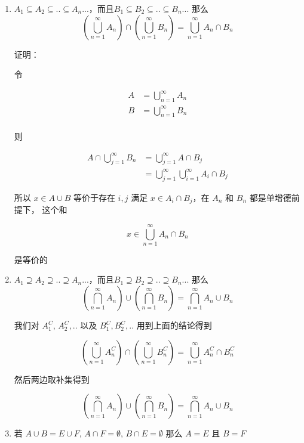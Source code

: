 \documentclass[12pt,a4paper]{ctexart}
\begin{document}
\begin{enumerate}
    \item $A_1 \subseteq A_2 \subseteq .. \subseteq A_n ...$，而且$B_1 \subseteq B_2 \subseteq .. \subseteq B_n ...$ 
     那么 
     \[
        \left( \bigcup_{n=1}^{\infty} A_n \right) \cap \left( \bigcup_{n=1}^{\infty} B_n \right) = \bigcup_{n=1}^{\infty} A_n \cap B_n
     \]

     证明：

     令

     \begin{align*}
        A &= \bigcup_{n=1}^{\infty} A_n \\
        B &= \bigcup_{n=1}^{\infty} B_n \\
     \end{align*}

     则

     \begin{align*}
        A \cap \bigcup_{j=1}^{\infty}B_n &= \bigcup_{j=1}^{\infty}A \cap B_j \\
        &= \bigcup_{j=1}^{\infty} \bigcup_{i=1}^{\infty} A_i \cap B_j
     \end{align*}

     所以 $x \in A \cup B$ 等价于存在 $i,j $ 满足 $x \in A_i \cap B_j$，在 $A_n$ 和 $B_n$ 都是单增德前提下， 这个和

     \[
     x \in \bigcup_{n=1}^{\infty}A_n \cap B_n
     \]

     是等价的


    \item $A_1 \supseteq A_2 \supseteq .. \supseteq A_n ...$，而且$B_1 \supseteq B_2 \supseteq .. \supseteq B_n ...$ 
     那么 
     \[
        \left( \bigcap_{n=1}^{\infty} A_n \right) \cup \left( \bigcap_{n=1}^{\infty} B_n \right) = \bigcap_{n=1}^{\infty} A_n \cup B_n
     \]

     我们对 $A_1^C, \, A_2^C, .. $ 以及 $B_1^C, B_2^C, .. $ 用到上面的结论得到

     \[
        \left( \bigcup_{n=1}^{\infty} A_n^C \right) \cap \left( \bigcup_{n=1}^{\infty} B_n^C \right) = \bigcup_{n=1}^{\infty} A_n^C \cap B_n ^C
     \]

     然后两边取补集得到

     \[
        \left( \bigcap_{n=1}^{\infty} A_n \right) \cup \left( \bigcap_{n=1}^{\infty} B_n \right) = \bigcap_{n=1}^{\infty} A_n \cup B_n 
     \]

    \item 若 $A \cup B = E \cup F,\, A \cap F = \emptyset,\, B \cap E = \emptyset$ 那么 $A = E$ 且 $B = F$


\end{enumerate}
\end{document}

